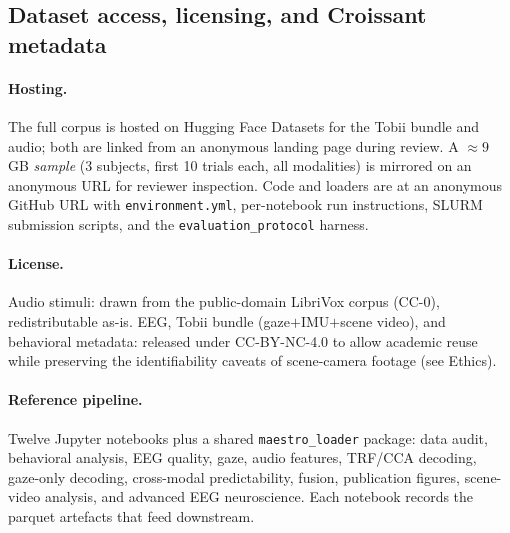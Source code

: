 \documentclass{article}
\begin{document}
\subsection{Dataset access, licensing, and Croissant metadata}
\label{sec:licensing}

\paragraph{Hosting.} The full corpus is hosted on Hugging Face Datasets for the Tobii bundle and audio; both are linked from an anonymous landing page during review. A $\approx 9$\,GB \emph{sample} (3 subjects, first 10 trials each, all modalities) is mirrored on an anonymous URL for reviewer inspection. Code and loaders are at an anonymous GitHub URL with \texttt{environment.yml}, per-notebook run instructions, SLURM submission scripts, and the \texttt{evaluation\_protocol} harness.

\paragraph{License.} Audio stimuli: drawn from the public-domain LibriVox corpus (CC-0), redistributable as-is. EEG, Tobii bundle (gaze$+$IMU$+$scene video), and behavioral metadata: released under CC-BY-NC-4.0 to allow academic reuse while preserving the identifiability caveats of scene-camera footage (see Ethics).


\paragraph{Reference pipeline.} Twelve Jupyter notebooks plus a shared \texttt{maestro\_loader} package: data audit, behavioral analysis, EEG quality, gaze, audio features, TRF/CCA decoding, gaze-only decoding, cross-modal predictability, fusion, publication figures, scene-video analysis, and advanced EEG neuroscience. Each notebook records the parquet artefacts that feed downstream. 
\end{document}

